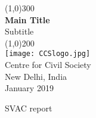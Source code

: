 \documentclass[a4paper, 12pt, twoside]{article}
\begin{document}
                    

\newpage
{}

\begin{titlepage}
\begin{center}
\line(1,0){300}\\
[0.25in]
\huge{\bfseries \textcolor{CCSbrown} {Main Title}} \\
[0.5cm]
\large{Subtitle} \\
    	
\line(1,0){200}\\
[2in]
\texttt{[image: CCSlogo.jpg]} \\
[1.5cm]
\LARGE{Centre for Civil Society} \\ 
[1.5cm]
{\Large New Delhi, India} \\
{\Large January 2019} \\
[1.85cm]


\end{center}
\end{titlepage}




SVAC report
\end{document}
